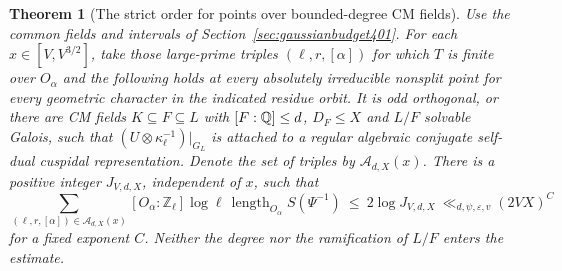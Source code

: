 \documentclass[a4paper,11pt]{article}
\newtheorem{theorem}[proposition]{Theorem}
\theoremstyle{definition}
\theoremstyle{remark}
\newcommand{\ZZ}{\mathbb Z}\newcommand{\ord}{\operatorname{ord}}
\numberwithin{equation}{section}
\begin{document}
\begin{theorem}[The strict order for points over bounded-degree CM fields]\leavevmode
\label{thm:cmcores403}
Use the common fields and intervals of
Section~\ref{sec:gaussianbudget401}. For each \(x\in[V,V^{3/2}]\),
take those large-prime triples \((\ell,r,[\alpha])\) for which
\(T\) is finite over \(O_\alpha\) and the following holds at every
absolutely irreducible nonsplit point for every geometric character
in the indicated residue orbit. It is odd orthogonal,
or there are CM fields \(K\subseteq F\subseteq L\) with
\([F:\mathbb Q]\le d\), \(D_F\le X\) and \(L/F\) solvable Galois, such
that \((U\otimes\kappa_\ell^{-1})|_{G_L}\) is attached to a
regular algebraic conjugate self-dual cuspidal representation.
Denote the set of triples by \(\mathcal A_{d,X}(x)\).
There is a positive integer \(J_{V,d,X}\), independent of \(x\),
such that
\[
 \sum_{(\ell,r,[\alpha])\in\mathcal A_{d,X}(x)}
 [O_\alpha:\ZZ_\ell]\log\ell\,
 \operatorname{length}_{O_\alpha}S(\Psi^{-1})
       \ \le\ 2\log J_{V,d,X}
       \ \ll_{d,\psi,\varepsilon,v} (2VX)^{C}
\]
for a fixed exponent \(C\). Neither the degree nor the
ramification of \(L/F\) enters the estimate.
\end{theorem}
\end{document}
